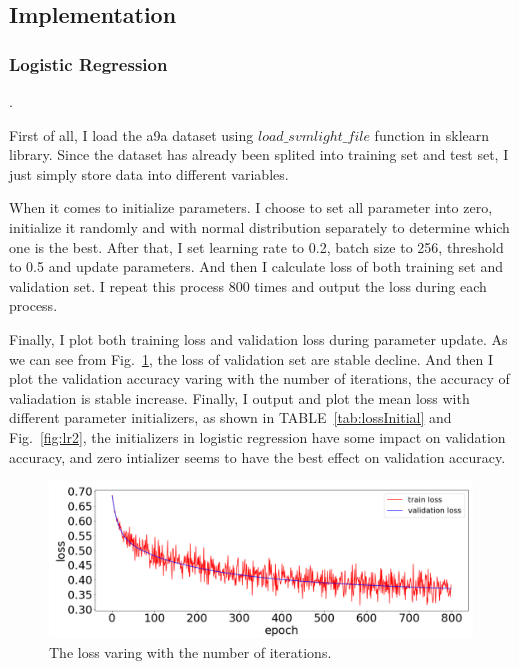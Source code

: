 \documentclass[journal, a4paper]{IEEEtran}
\begin{document}
\subsection{Implementation}

\subsubsection{Logistic Regression}
.

First of all, I load the a9a dataset using $load\_svmlight\_file$ function in sklearn library. Since the dataset has already been splited into training set and test set, I just simply store data into different variables.

When it comes to initialize parameters. I choose to set all parameter into zero, initialize it randomly and with normal distribution separately to determine which one is the best. After that, I set learning rate to 0.2, batch size to 256, threshold to 0.5 and  update parameters. And then I calculate loss of both training set and validation set. I repeat this process 800 times and output the loss during each process.

Finally, I plot both training loss and validation loss during parameter update. As we can see from Fig.~\ref{fig:lr0}, the loss of validation set are stable decline. And then I plot the validation accuracy varing with the number of iterations, the accuracy of valiadation is stable increase. Finally, I output and plot the mean loss with different parameter initializers, as shown in TABLE~\ref{tab:lossInitial} and Fig.~\ref{fig:lr2}, the initializers in logistic regression have some impact on validation accuracy, and zero intializer seems to have the best effect on validation accuracy.

\begin{figure}[!hbt]
		\begin{center}
		\includegraphics[width=\columnwidth]{lr0}
		\caption{The loss varing with the number of iterations.}
		\label{fig:lr0}
		\end{center}
	\end{figure}
	
\end{document}
